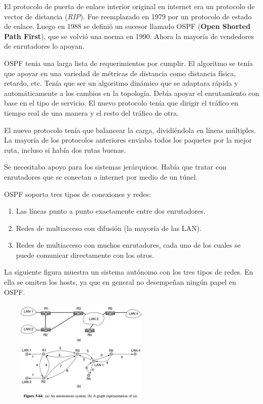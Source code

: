 \documentclass[10pt,a4paper]{report}
\begin{document}
	\par El protocolo de puerta de enlace interior original en internet era un protocolo de vector de distancia (\textit{RIP}). Fue reemplazado en 1979 por un protocolo de estado de enlace. Luego en 1988 se definió un sucesor llamado OSPF (\textbf{Open Shorted Path First}), que se volvió una norma en 1990. Ahora la mayoría de vendedores de enrutadores lo apoyan.
	
	\par OSPF tenía una larga lista de requerimientos por cumplir. El algoritmo se tenía que apoyar en una variedad de métricas de distancia como distancia física, retardo, etc. Tenía que ser un algoritmo dinámico que se adaptara rápida y automáticamente a los cambios en la topología. Debía apoyar el enrutamiento con base en el tipo de servicio. El nuevo protocolo tenía que dirigir el tráfico en tiempo real de una manera y el resto del tráfico de otra.
	
	\par El nuevo protocolo tenía que balancear la carga, dividiéndola en líneas múltiples. La mayoría de los protocolos anteriores enviaba todos los paquetes por la mejor ruta, incluso si había dos rutas buenas.

	\par Se necesitaba apoyo para los sistemas jerárquicos. Había que tratar con enrutadores que se conectan a internet por medio de un túnel.

	\par OSPF soporta tres tipos de conexiones y redes:

		\begin{enumerate}
			\item Las líneas punto a punto exactamente entre dos enrutadores.
			\item Redes de multiacceso con difusión (la mayoría de las LAN).
			\item Redes de multiacceso con muchos enrutadores, cada uno de los cuales se puede comunicar directamente con los otros.
		\end{enumerate}

	\par La siguiente figura muestra un sistema autónomo con los tres tipos de redes. En ella se omiten los hosts, ya que en general no desempeñan ningún papel en OSPF.

		\begin{center}
			\includegraphics[width=8cm, height=5cm]{./imagenes/ospf.png} 
		\end{center}
\end{document}
